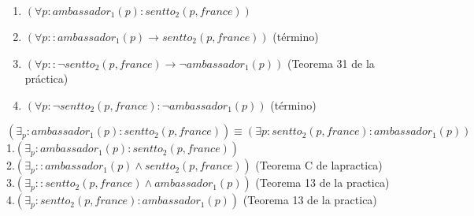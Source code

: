 \documentclass[a4paper,11pt]{article}
\begin{document}
\begin{enumerate}
    \item $(\forall p : ambassador_1(p) : sentto_2(p, france))$
    \item $(\forall p :: ambassador_1(p) \rightarrow sentto_2(p, france))$ \hfill (término)
    \item $(\forall p :: \neg sentto_2(p, france) \rightarrow \neg ambassador_1(p))$ \hfill (Teorema 31 de la práctica)
    \item $(\forall p : \neg sentto_2(p, france) : \neg ambassador_1(p))$ \hfill (término) 
\end{enumerate}

$(\exists_p: ambassador_1(p) : sentto_2(p,france)) \equiv (\exists p: sentto_2(p,france) : ambassador_1(p))$\\
1.$(\exists_p: ambassador_1(p) : sentto_2(p,france))$\\
2.$(\exists_p:: ambassador_1(p) \land sentto_2(p,france))$ (Teorema C de lapractica) \\
3.$(\exists_p:: sentto_2(p,france) \land ambassador_1(p) )$ (Teorema 13 de la practica)\\
4.$(\exists_p: sentto_2(p,france) : ambassador_1(p))$ (Teorema 13 de la practica)\\
\end{document}
